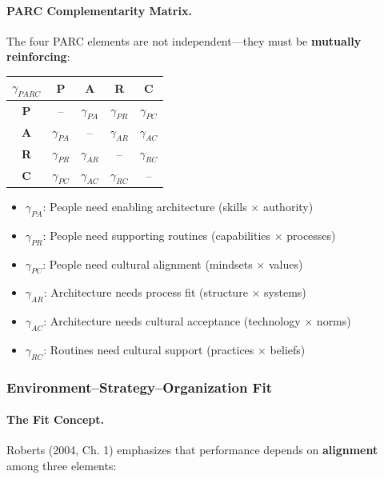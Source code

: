 \paragraph{PARC Complementarity Matrix.}
The four PARC elements are not independent---they must be \textbf{mutually reinforcing}:

\begin{center}
\renewcommand{\arraystretch}{1.4}
\begin{tabular}{|c|c|c|c|c|}
\hline
$\gamma_{PARC}$ & \textbf{P} & \textbf{A} & \textbf{R} & \textbf{C} \\
\hline
\textbf{P} & -- & $\gamma_{PA}$ & $\gamma_{PR}$ & $\gamma_{PC}$ \\
\textbf{A} & $\gamma_{PA}$ & -- & $\gamma_{AR}$ & $\gamma_{AC}$ \\
\textbf{R} & $\gamma_{PR}$ & $\gamma_{AR}$ & -- & $\gamma_{RC}$ \\
\textbf{C} & $\gamma_{PC}$ & $\gamma_{AC}$ & $\gamma_{RC}$ & -- \\
\hline
\end{tabular}
\end{center}

\begin{itemize}
    \item $\gamma_{PA}$: People need enabling architecture (skills $\times$ authority)
    \item $\gamma_{PR}$: People need supporting routines (capabilities $\times$ processes)
    \item $\gamma_{PC}$: People need cultural alignment (mindsets $\times$ values)
    \item $\gamma_{AR}$: Architecture needs process fit (structure $\times$ systems)
    \item $\gamma_{AC}$: Architecture needs cultural acceptance (technology $\times$ norms)
    \item $\gamma_{RC}$: Routines need cultural support (practices $\times$ beliefs)
\end{itemize}

\subsubsection{Environment--Strategy--Organization Fit}

\paragraph{The Fit Concept.}
Roberts (2004, Ch. 1) emphasizes that performance depends on \textbf{alignment}
among three elements:


